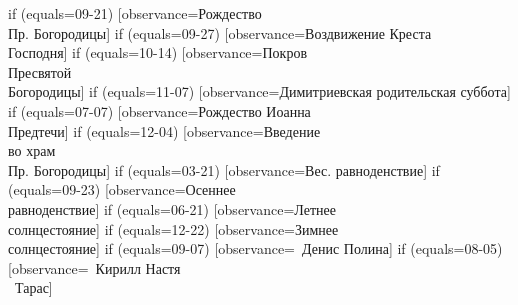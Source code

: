 {  if (equals=09-21) [observance=Рождество\\ Пр. Богородицы]
  if (equals=09-27) [observance=Воздвижение Креста\\ Господня]
  if (equals=10-14) [observance=Покров\\ Пресвятой\\ Богородицы]
  if (equals=11-07) [observance=Димитриевская родительская суббота]
  if (equals=07-07) [observance=Рождество Иоанна\\ Предтечи]
  if (equals=12-04) [observance=Введение\\ во храм\\ Пр. Богородицы]
  if (equals=03-21) [observance=Вес. равноденствие]
  if (equals=09-23) [observance=Осеннее\\ равноденствие]
  if (equals=06-21) [observance=Летнее\\ солнцестояние]
  if (equals=12-22) [observance=Зимнее\\ солнцестояние]
  if (equals=09-07) [observance=\married\ \mycm Денис Полина]
  if (equals=08-05) [observance=\married\ Кирилл Настя\\ \married\ Тарас]
}
